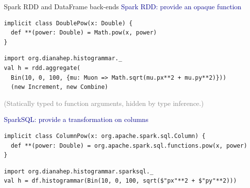 \documentclass[aspectratio=169]{beamer}
\begin{document}
\begin{frame}[fragile]{Spark RDD and DataFrame back-ends}
\vspace{0.5 cm}
\textcolor{darkblue}{\large Spark RDD: provide an opaque function}

\begin{lstlisting}[basicstyle=\ttfamily\scriptsize\color{gray}]
implicit class DoublePow(x: Double) {
  def **(power: Double) = Math.pow(x, power)
}
\end{lstlisting}

\vspace{-0.25 cm}
\small
\begin{verbatim}
import org.dianahep.histogrammar._
val h = rdd.aggregate(
  Bin(10, 0, 100, {mu: Muon => Math.sqrt(mu.px**2 + mu.py**2)}))
  (new Increment, new Combine)
\end{verbatim}

\textcolor{gray}{(Statically typed to function arguments, hidden by type inference.)}

\vspace{0.5 cm}
\textcolor{darkblue}{\large SparkSQL: provide a transformation on columns}

\begin{lstlisting}[basicstyle=\ttfamily\scriptsize\color{gray}]
implicit class ColumnPow(x: org.apache.spark.sql.Column) {
  def **(power: Double) = org.apache.spark.sql.functions.pow(x, power)
}
\end{lstlisting}

\vspace{-0.25 cm}
\small
\begin{verbatim}
import org.dianahep.histogrammar.sparksql._
val h = df.histogrammar(Bin(10, 0, 100, sqrt($"px"**2 + $"py"**2)))
\end{verbatim}
\end{frame}
\end{document}

